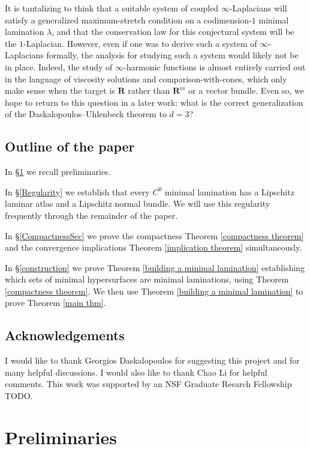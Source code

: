\documentclass[reqno,11pt]{amsart}
\newcommand{\RR}{\mathbf{R}}
\theoremstyle{definition}
\numberwithin{equation}{section}
\begin{document}
It is tantalizing to think that a suitable system of coupled $\infty$-Laplacians will satisfy a generalized maximum-stretch condition on a codimension-$1$ minimal lamination $\lambda$, and that the conservation law for this conjectural system will be the $1$-Laplacian.
However, even if one was to derive such a system of $\infty$-Laplacians formally, the analysis for studying such a system would likely not be in place.
Indeed, the study of $\infty$-harmonic functions is almost entirely carried out in the language of viscosity solutions and comparison-with-cones, which only make sense when the target is $\RR$ rather than $\RR^m$ or a vector bundle.
Even so, we hope to return to this question in a later work: what is the correct generalization of the Daskalopoulos--Uhlenbeck theorem to $d = 3$?

\subsection{Outline of the paper}
In \S\ref{Prelims} we recall preliminaries.

In \S\ref{Regularity} we establish that every $C^0$ minimal lamination has a Lipschitz laminar atlas and a Lipschitz normal bundle.
We will use this regularity frequently through the remainder of the paper.

In \S\ref{CompactnessSec} we prove the compactness Theorem \ref{compactness theorem} and the convergence implications Theorem \ref{implication theorem} simultaneously.

In \S\ref{construction} we prove Theorem \ref{building a minimal lamination} establishing which sets of minimal hypersurfaces are minimal laminations, using Theorem \ref{compactness theorem}.
We then use Theorem \ref{building a minimal lamination} to prove Theorem \ref{main thm}.



\subsection{Acknowledgements}
I would like to thank Georgios Daskalopoulos for suggesting this project and for many helpful discussions.
I would also like to thank Chao Li for helpful comments.
This work was supported by an NSF Graduate Resarch Fellowship TODO.




\section{Preliminaries}\label{Prelims}
\end{document}
